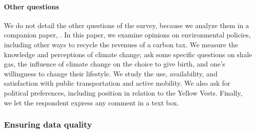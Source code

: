 \documentclass[11pt]{article}
\begin{document}
\paragraph{Other questions}
We do not detail the other questions of the survey, because we analyze them in a companion paper, \citet{douenne_french_2019}. In this paper, we examine opinions on environmental policies, including other ways to recycle the revenues of a carbon tax. We measure the knowledge and perceptions of climate change; ask some specific questions on shale gas, the influence of climate change on the choice to give birth, and one's willingness to change their lifestyle. We study the use, availability, and satisfaction with public transportation and active mobility. We also ask for political preferences, including position in relation to the Yellow Vests. Finally, we let the respondent express any comment in a text box.

\subsubsection{Ensuring data quality}
\end{document}
